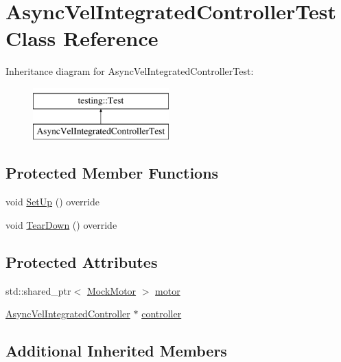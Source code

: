 \hypertarget{classAsyncVelIntegratedControllerTest}{}\section{Async\+Vel\+Integrated\+Controller\+Test Class Reference}
\label{classAsyncVelIntegratedControllerTest}
Inheritance diagram for Async\+Vel\+Integrated\+Controller\+Test\+:\begin{figure}[H]
\begin{center}
\leavevmode
\includegraphics[height=2.000000cm]{classAsyncVelIntegratedControllerTest}
\end{center}
\end{figure}
\subsection*{Protected Member Functions}
\begin{DoxyCompactItemize}
\item 
void \mbox{\hyperlink{classAsyncVelIntegratedControllerTest_aa0f8199a3238cd134191de866fdda12f}{Set\+Up}} () override
\item 
void \mbox{\hyperlink{classAsyncVelIntegratedControllerTest_a692709cf48fa34662b5b511c3bf4d871}{Tear\+Down}} () override
\end{DoxyCompactItemize}
\subsection*{Protected Attributes}
\begin{DoxyCompactItemize}
\item 
std\+::shared\+\_\+ptr$<$ \mbox{\hyperlink{classokapi_1_1MockMotor}{Mock\+Motor}} $>$ \mbox{\hyperlink{classAsyncVelIntegratedControllerTest_ad4f999c316310781f9a739a8bc415de4}{motor}}
\item 
\mbox{\hyperlink{classokapi_1_1AsyncVelIntegratedController}{Async\+Vel\+Integrated\+Controller}} $\ast$ \mbox{\hyperlink{classAsyncVelIntegratedControllerTest_a730f64274220339bb51873d91127ba35}{controller}}
\end{DoxyCompactItemize}
\subsection*{Additional Inherited Members}


